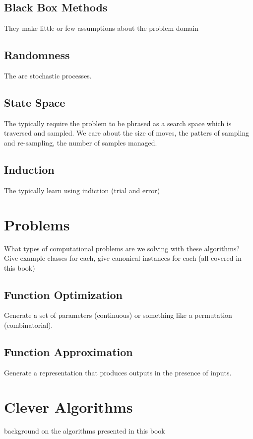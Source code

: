 \subsection{Black Box Methods}
They make little or few assumptions about the problem domain

\subsection{Randomness}
The are stochastic processes.

\subsection{State Space}
The typically require the problem to be phrased as a search space which is traversed and sampled.
We care about the size of moves, the patters of sampling and re-sampling, the number of samples managed.

\subsection{Induction}
The typically learn using indiction (trial and error)



\section{Problems}
What types of computational problems are we solving with these algorithms?
Give example classes for each, give canonical instances for each (all covered in this book)

\subsection{Function Optimization}
Generate a set of parameters (continuous) or something like a permutation (combinatorial).

\subsection{Function Approximation}
Generate a representation that produces outputs in the presence of inputs.



\section{Clever Algorithms}
background on the algorithms presented in this book

